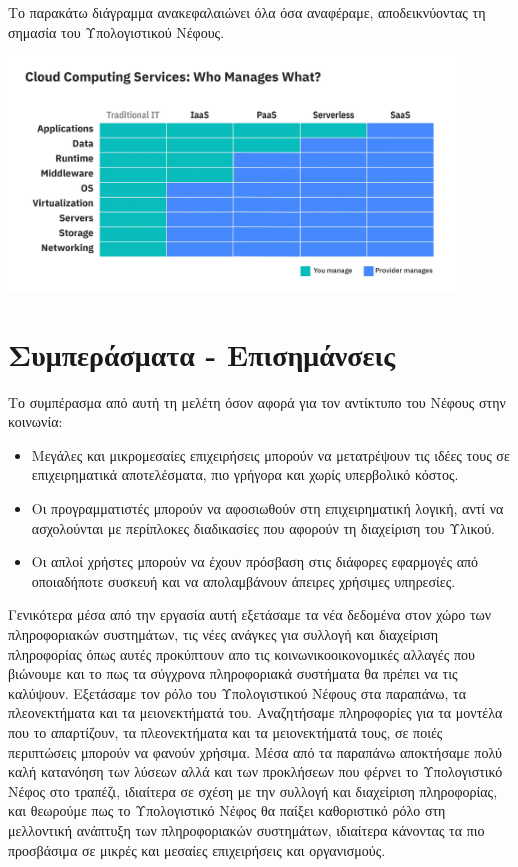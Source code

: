 \documentclass{article}
\begin{document}
Το παρακάτω διάγραμμα ανακεφαλαιώνει όλα όσα αναφέραμε, αποδεικνύοντας τη σημασία του Υπολογιστικού Νέφους. 


\includegraphics[width=120mm]{ibm.jpg}

\section{Συμπεράσματα - Επισημάνσεις}
Το συμπέρασμα από αυτή τη μελέτη όσον αφορά για τον αντίκτυπο του Νέφους στην κοινωνία:
\begin{itemize}
\item Μεγάλες και μικρομεσαίες επιχειρήσεις μπορούν να μετατρέψουν τις ιδέες τους σε επιχειρηματικά αποτελέσματα, πιο γρήγορα και χωρίς υπερβολικό κόστος.
\item Οι προγραμματιστές μπορούν να αφοσιωθούν στη επιχειρηματική λογική, αντί να ασχολούνται με περίπλοκες διαδικασίες που αφορούν τη διαχείριση του Υλικού.
\item	Οι απλοί χρήστες μπορούν να έχουν πρόσβαση στις διάφορες εφαρμογές από οποιαδήποτε συσκευή και να απολαμβάνουν άπειρες χρήσιμες υπηρεσίες.
\end{itemize}
Γενικότερα μέσα από την εργασία αυτή εξετάσαμε τα νέα δεδομένα στον χώρο των πληροφοριακών συστημάτων, τις νέες ανάγκες για συλλογή και διαχείριση πληροφορίας όπως αυτές προκύπτουν απο τις κοινωνικοοικονομικές αλλαγές που βιώνουμε και το πως τα σύγχρονα πληροφοριακά συστήματα θα πρέπει να τις καλύψουν. Εξετάσαμε τον ρόλο του Υπολογιστικού Νέφους στα παραπάνω, τα πλεονεκτήματα και τα μειονεκτήματά του. Αναζητήσαμε πληροφορίες για τα μοντέλα που το απαρτίζουν, τα πλεονεκτήματα και τα μειονεκτήματά τους, σε ποιές περιπτώσεις μπορούν να φανούν χρήσιμα. Μέσα από τα παραπάνω αποκτήσαμε πολύ καλή κατανόηση των λύσεων αλλά και των προκλήσεων που φέρνει το Υπολογιστικό Νέφος στο τραπέζι, ιδιαίτερα σε σχέση με την συλλογή και διαχείριση πληροφορίας, και θεωρούμε πως το Υπολογιστικό Νέφος θα παίξει καθοριστικό ρόλο στη μελλοντική ανάπτυξη των πληροφοριακών συστημάτων, ιδιαίτερα κάνοντας τα πιο προσβάσιμα σε μικρές και μεσαίες επιχειρήσεις και οργανισμούς.
\end{document}
